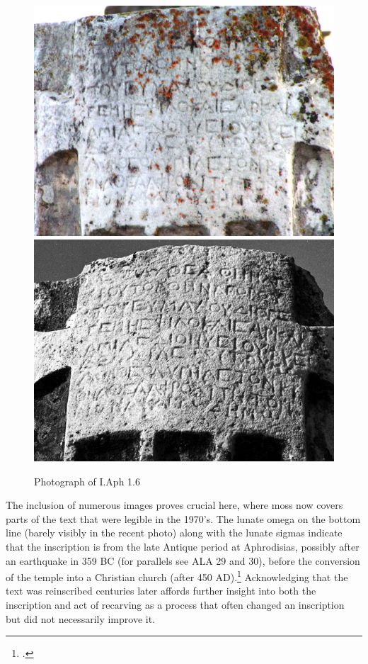 \documentclass[amsthm,ebook]{saparticle}
\begin{document}
\begin{figure}[!hbp]
\centering
 \includegraphics[width=\columnwidth]{PaperproposalforEAGLEfinal-img005.jpg}
  \includegraphics[width=\columnwidth]{PaperproposalforEAGLEfinal-img006.jpg}
\caption{Photograph of I.Aph 1.6}
\label{fig:5}
\end{figure}
 



The inclusion of numerous images proves crucial here, where moss now covers parts of the text that were legible in the
1970’s. The lunate omega on the bottom line (barely visibly in the recent photo) along with the lunate sigmas indicate
that the inscription is from the late Antique period at Aphrodisias, possibly after an earthquake in 359 BC (for
parallels see ALA 29 and 30), before the conversion of the temple into a Christian church (after 450 AD).\footnote{\citet[41-42]{smith1996}.} Acknowledging that the text was reinscribed centuries later affords further insight into both
the inscription and act of recarving as a process that often changed an inscription but did not necessarily improve it.
\end{document}
